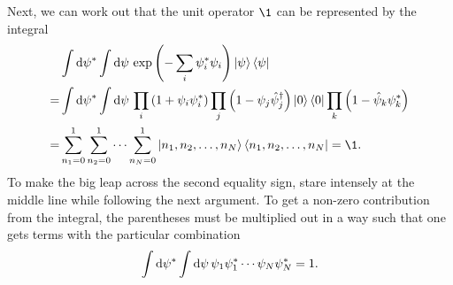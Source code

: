 Next, we can work out that the unit operator $\1$ can be represented by the integral
\begin{equation}
\begin{split}
	 \iffalse
	 & \int \dif \conj{\psi} \int \dif \psi \, e^{-\sum_i \conj\psi_i \psi_i} \ket{\psi} \bra{\psi} \\
	=& \int \dif \conj{\psi} \int \dif \psi \, \prod_i \left( 1 + \psi_i \conj{\psi}_i \right) \prod_j \left( 1 - \psi_j \creat_j \right) \ket{0} \bra{0} \prod_k \left( 1 - \destr_k \conj\psi_k \right) \\
	=& \int \dif \conj{\psi} \int \dif \psi \, \prod_i \left( 1 + \psi_i \conj{\psi}_i \right) \prod_j \left( 1 - \psi_j \creat_j \right) \ket{0} \bra{0} \left( 1 - \destr_j \conj\psi_j \right) \\
	=& \sum_{n_1=0}^1 \sum_{n_2=0}^1\cdots \sum_{n_N=0}^1 \ket{n_1, n_2, \ldots, n_N} \bra{n_1, n_2, \ldots, n_N} = \1 \\
	=& \int \dif \conj{\psi} \int \dif \psi \left[ \left( -\sum_i \conj{\psi}_i \psi_i \right) \ket{0} \bra{0} + \left( -\sum_j \psi_j \creat_j \right) \ket{0} \bra{0} \left( -\sum_k \destr_k \conj\psi_k \right) \right] \\
	=& \int \dif \conj{\psi} \int \dif \psi \left[ \sum_i \psi_i \conj\psi_i \ket{0} \bra{0} + \sum_{j,k} \psi_j \conj\psi_k \ket{1_j} \bra{1_k} \right] \\
	=& \ket{0} \bra{0} + \sum_j \ket{1_j} \bra{1_j} = \1 . \\
	\fi
	 & \int \dif \conj{\psi} \int \dif \psi \, \exp \left( -\sum_i \conj\psi_i \psi_i \right) \ket{\psi} \bra{\psi} \\
	=& \int \dif \conj{\psi} \int \dif \psi \, \prod_i \left( 1 + \psi_i \conj{\psi}_i \right) \prod_j \left( 1 - \psi_j \creat_j \right) \ket{0} \bra{0} \prod_k \left( 1 - \destr_k \conj\psi_k \right) \\
	=& \sum_{n_1=0}^1 \sum_{n_2=0}^1\cdots \sum_{n_N=0}^1 \ket{n_1, n_2, \ldots, n_N} \bra{n_1, n_2, \ldots, n_N} = \1 . \\
\end{split}
\label{eq:tft:completeness_grassmann_discrete}
\end{equation}
To make the big leap across the second equality sign, stare intensely at the middle line while following the next argument.
To get a non-zero contribution from the integral, the parentheses must be multiplied out in a way such that one gets terms with the particular combination
\begin{equation}
	\int \mathop{}\!\mathrm{d} {\psi}^* \int \mathop{}\!\mathrm{d} \psi \, \psi_1 {\psi}^*_1 \cdots \psi_N {\psi}^*_N = 1 .
\label{eq:tft:integral_saturated}
\end{equation}
